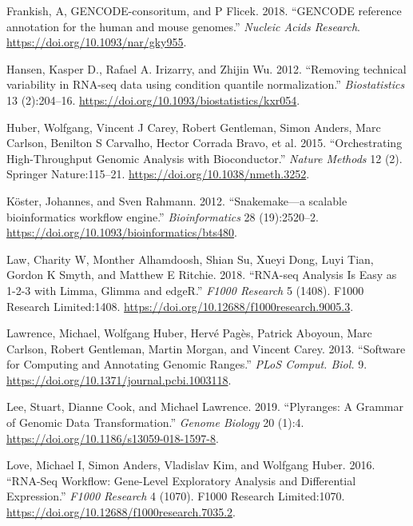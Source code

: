 \documentclass[
]{article}
\begin{document}
\leavevmode\hypertarget{ref-gencode}{}%
Frankish, A, GENCODE-consoritum, and P Flicek. 2018. ``GENCODE reference annotation for the human and mouse genomes.'' \emph{Nucleic Acids Research}. \url{https://doi.org/10.1093/nar/gky955}.

\leavevmode\hypertarget{ref-Hansen2012}{}%
Hansen, Kasper D., Rafael A. Irizarry, and Zhijin Wu. 2012. ``Removing technical variability in RNA-seq data using condition quantile normalization.'' \emph{Biostatistics} 13 (2):204--16. \url{https://doi.org/10.1093/biostatistics/kxr054}.

\leavevmode\hypertarget{ref-bioc}{}%
Huber, Wolfgang, Vincent J Carey, Robert Gentleman, Simon Anders, Marc Carlson, Benilton S Carvalho, Hector Corrada Bravo, et al. 2015. ``Orchestrating High-Throughput Genomic Analysis with Bioconductor.'' \emph{Nature Methods} 12 (2). Springer Nature:115--21. \url{https://doi.org/10.1038/nmeth.3252}.

\leavevmode\hypertarget{ref-snakemake}{}%
Köster, Johannes, and Sven Rahmann. 2012. ``Snakemake---a scalable bioinformatics workflow engine.'' \emph{Bioinformatics} 28 (19):2520--2. \url{https://doi.org/10.1093/bioinformatics/bts480}.

\leavevmode\hypertarget{ref-Law2018-f1000}{}%
Law, Charity W, Monther Alhamdoosh, Shian Su, Xueyi Dong, Luyi Tian, Gordon K Smyth, and Matthew E Ritchie. 2018. ``RNA-seq Analysis Is Easy as 1-2-3 with Limma, Glimma and edgeR.'' \emph{F1000 Research} 5 (1408). F1000 Research Limited:1408. \url{https://doi.org/10.12688/f1000research.9005.3}.

\leavevmode\hypertarget{ref-granges}{}%
Lawrence, Michael, Wolfgang Huber, Hervé Pagès, Patrick Aboyoun, Marc Carlson, Robert Gentleman, Martin Morgan, and Vincent Carey. 2013. ``Software for Computing and Annotating Genomic Ranges.'' \emph{PLoS Comput. Biol.} 9. \url{https://doi.org/10.1371/journal.pcbi.1003118}.

\leavevmode\hypertarget{ref-Lee2019}{}%
Lee, Stuart, Dianne Cook, and Michael Lawrence. 2019. ``Plyranges: A Grammar of Genomic Data Transformation.'' \emph{Genome Biology} 20 (1):4. \url{https://doi.org/10.1186/s13059-018-1597-8}.

\leavevmode\hypertarget{ref-Love2016-f1000}{}%
Love, Michael I, Simon Anders, Vladislav Kim, and Wolfgang Huber. 2016. ``RNA-Seq Workflow: Gene-Level Exploratory Analysis and Differential Expression.'' \emph{F1000 Research} 4 (1070). F1000 Research Limited:1070. \url{https://doi.org/10.12688/f1000research.7035.2}.
\end{document}
